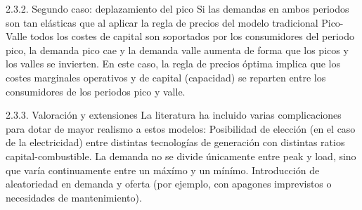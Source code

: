 \documentclass[10pt,a4paper]{article}
\begin{document}
2.3.2. Segundo caso: deplazamiento del pico
Si las demandas en ambos periodos son tan elásticas que al aplicar la regla de precios del modelo tradicional Pico-Valle todos los costes de capital son soportados por los consumidores del periodo pico, la demanda pico cae y la demanda valle aumenta de forma que los picos y los valles se invierten. 
En este caso, la regla de precios óptima implica que los costes marginales operativos y de capital (capacidad) se reparten entre los consumidores de los periodos pico y valle.  
 
2.3.3. Valoración y extensiones
La literatura  ha incluido varias complicaciones para dotar de mayor realismo a estos modelos:
	Posibilidad de elección (en el caso de la electricidad) entre distintas tecnologías de generación con distintas ratios capital-combustible.
	La demanda no se divide únicamente entre peak y load, sino que varía continuamente entre un máxímo y un mínímo. 
	Introducción de aleatoriedad en demanda y oferta (por ejemplo, con apagones imprevistos o necesidades de mantenimiento).
\end{document}
